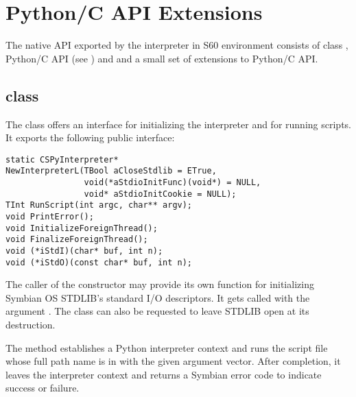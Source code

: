 %
%
%

\section{Python/C API Extensions}
\label{capiextensions}

The native API exported by the interpreter in S60 environment
consists of class , Python/C API (see
\cite{PyCAPI}) and and a small set of extensions to Python/C API.

\subsection{class }
The class  offers an interface for initializing the 
interpreter and for running scripts. It exports the following public 
interface:
\begin{verbatim}
static CSPyInterpreter* 
NewInterpreterL(TBool aCloseStdlib = ETrue,
                void(*aStdioInitFunc)(void*) = NULL,
                void* aStdioInitCookie = NULL);
TInt RunScript(int argc, char** argv);
void PrintError();
void InitializeForeignThread();
void FinalizeForeignThread();
void (*iStdI)(char* buf, int n);
void (*iStdO)(const char* buf, int n);
\end{verbatim}

The caller of the constructor  may 
provide its own function  for initializing Symbian OS 
STDLIB's standard I/O descriptors. It gets called with the argument 
. The  class can also be 
requested to leave STDLIB open at its destruction.

The  method establishes a Python 
interpreter context and runs the script file whose full path name is in 
 with the given argument vector. After completion, it leaves 
the interpreter context and returns a Symbian error code to indicate success 
or failure.

